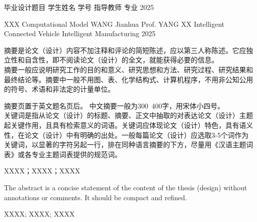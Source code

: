 \documentclass{document}
\begin{document}
\makecovercn
  {毕业设计题目}
  {学生姓名}
  {学号}
  {指导教师}
  {}%
  {专业}
  {}%
  {2025}

\makecoveren
  {XXX Computational Model}
  {WANG Jianhua}
  {Prof. YANG XX}
  {} %
  {Intelligent Connected Vehicle}
  {Intelligent Manufacturing}%
  {} %
  {2025} 


\begin{cquabstract}

摘要是论文（设计）内容不加注释和评论的简短陈述，应以第三人称陈述。它应独立性和自含性，即不阅读论文（设计）的全文，就能获得必要的信息。\\

摘要一般应说明研究工作的目的和意义、研究思想和方法、研究过程、研究结果和最终结论等。摘要中一般不用图、表、化学结构式、计算机程序，不用非公知公用的符号、术语和非法定的计量单位。

摘要页置于英文题名页后。 
中文摘要一般为300~400字，用宋体小四号。 \\
关键词是指从论文（设计）的标题、摘要、正文中抽取的对表达论文（设计）主题起关键作用，且具有检索意义的词语。关键词应体现论文（设计）特色，具有语义性，在论文（设计）中有明确的出处。一般每篇论文（设计）应选取3-5个词作为关键词，以显著的字符另起一行，排在同种语言摘要的下方，尽量用《汉语主题词表》或各专业主题词表提供的规范词。\\
\end{cquabstract}
  
\begin{cqukeywords}%
    XXXX；XXXX；XXXX
\end{cqukeywords}

\begin{cquabstracten}
  The abstract is a concise statement of the content of the thesis (design) without annotations or comments. It should be compact and refined.
\end{cquabstracten}

\begin{cqukeywordsen}
  XXXX; XXXX; XXXX
\end{cqukeywordsen}
  
\begin{cqucontents}

\end{cqucontents}
\end{document}
